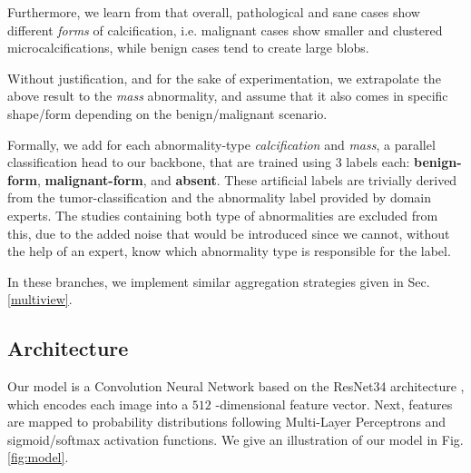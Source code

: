 \documentclass[11pt]{article}
\begin{document}
Furthermore, we learn from \autocite{azam21} that overall, pathological and sane
cases show different \emph{forms} of calcification, i.e. malignant cases show smaller and clustered
microcalcifications, while benign cases tend to create large blobs.

Without justification, and for the sake of experimentation,
we extrapolate the above result to the \emph{mass} abnormality, and assume
that it also comes in specific shape/form depending on the benign/malignant
scenario.

Formally, we add for each abnormality-type \emph{calcification} and \emph{mass},
a parallel classification head to our backbone, that are trained using
3 labels each: \textbf{benign-form}, \textbf{malignant-form}, and \textbf{absent}.
These artificial labels are trivially derived from the tumor-classification and
the abnormality label provided by domain experts.
The studies containing both type of abnormalities are excluded from this, due to the added noise that would be introduced since we cannot, without the help of an expert, know which abnormality type is responsible for the label.

In these branches, we implement similar aggregation strategies
given in Sec. \ref{multiview}.

\subsection{Architecture}
\label{sec:orga43f6c4}

Our model is a Convolution Neural Network based on the ResNet34
architecture \autocite{he15}, which encodes each image into a \(512\) -dimensional feature
vector.
Next, features are mapped to probability distributions following Multi-Layer Perceptrons
and sigmoid/softmax activation functions.
We give an illustration of our model in Fig. \ref{fig:model}.
\end{document}
